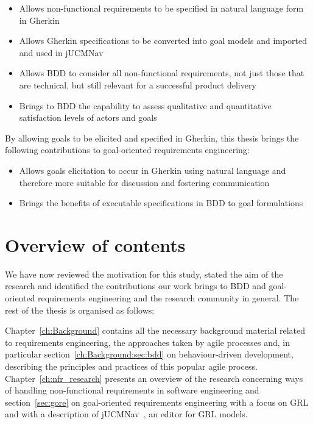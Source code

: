 \documentclass[dissertation,final]{softeng}
\begin{document}
{\begin{center}
\begin{itemize}
\item Allows non-functional requirements to be specified in natural language form in Gherkin
\item Allows Gherkin specifications to be converted into goal models and imported and used in jUCMNav
\item Allows BDD to consider all non-functional requirements, not just those that are technical, but still relevant for a successful product delivery
\item Brings to BDD the capability to assess qualitative and quantitative satisfaction levels of actors and goals 
\end{itemize}
\end{center}

By allowing goals to be elicited and specified in Gherkin, this thesis brings the following contributions to goal-oriented requirements engineering:

\begin{center}
\begin{itemize}
\item Allows goals elicitation to occur in Gherkin using natural language and therefore more suitable for discussion and fostering communication
\item Brings the benefits of executable specifications in BDD to goal formulations
\end{itemize}
\end{center}


\section{Overview of contents}

We have now reviewed the motivation for this study, stated the aim of the research and identified the contributions our work brings to BDD and goal-oriented requirements engineering and the research community in general. The rest of the thesis is organised as follows:

Chapter~\ref{ch:Background} contains all the necessary background material related to requirements engineering, the approaches taken by agile processes and, in particular section~\ref{ch:Background:sec:bdd} on behaviour-driven development, describing the principles and practices of this popular agile process. Chapter~\ref{ch:nfr_research} presents an overview of the research concerning ways of handling non-functional requirements in software engineering and section~\ref{sec:gore} on goal-oriented requirements engineering with a focus on GRL and with a description of jUCMNav~\citep{Amyot2010}, an editor for GRL models.

}
\end{document}
